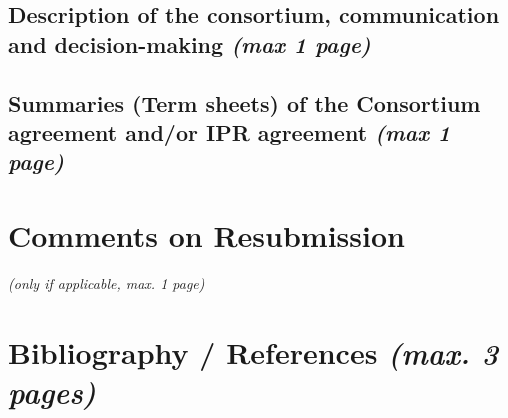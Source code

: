 \documentclass[11pt,twoside,a4paper]{article}
\begin{document}
\subsection{Description of the consortium, communication and decision-making
  {\small \emph{(max 1 page)}}}


%
%



\subsection{Summaries (Term sheets) of the Consortium agreement and/or IPR
  agreement {\small \emph{(max 1 page)}}}


\section{Comments on Resubmission}
\emph{ (only if applicable, max. 1 page)}


\section{Bibliography / References {\small \emph{(max. 3 pages)}}}
 




\end{document}

